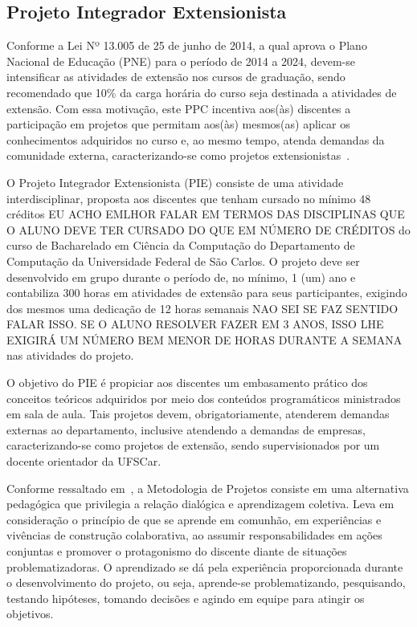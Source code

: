 
\subsection{Projeto Integrador Extensionista}\label{sec:pie-introducao}


Conforme a Lei Nº 13.005 de 25 de junho de 2014, a qual aprova o Plano Nacional de Educação (PNE) para o período de 2014 a 2024, devem-se intensificar as atividades de extensão nos cursos de graduação, sendo recomendado que 10\% da carga horária do curso seja destinada a atividades de extensão. Com essa motivação, este PPC incentiva aos(às) discentes a participação em projetos que permitam aos(às) mesmos(as) aplicar os conhecimentos adquiridos no curso e, ao mesmo tempo, atenda demandas da comunidade externa, caracterizando-se como projetos extensionistas~\cite{Brasil2014}.

O Projeto Integrador Extensionista (PIE) consiste de uma atividade interdisciplinar, proposta aos discentes que tenham cursado no mínimo 48 créditos {EU ACHO EMLHOR FALAR EM TERMOS DAS DISCIPLINAS QUE O ALUNO DEVE TER CURSADO DO QUE EM NÚMERO DE CRÉDITOS} do curso de Bacharelado em Ciência da Computação do Departamento de Computação da Universidade Federal de São Carlos. O projeto deve ser desenvolvido em grupo durante o período de, no mínimo, 1 (um) ano e contabiliza 300 horas em atividades de extensão para seus participantes, exigindo dos mesmos uma dedicação de 12 horas semanais {NAO SEI SE FAZ SENTIDO FALAR ISSO. SE O ALUNO RESOLVER FAZER EM 3 ANOS, ISSO LHE EXIGIRÁ UM NÚMERO BEM MENOR DE HORAS DURANTE A SEMANA} nas atividades do projeto.

O objetivo do PIE é propiciar aos discentes um embasamento prático dos conceitos teóricos adquiridos por meio dos conteúdos programáticos ministrados em sala de aula.  Tais projetos devem, obrigatoriamente, atenderem demandas externas ao departamento, inclusive atendendo a demandas de empresas, caracterizando-se como projetos de extensão, sendo supervisionados por um docente orientador da UFSCar.

Conforme ressaltado em~\cite{SENAC}, a Metodologia de Projetos consiste em uma alternativa pedagógica que privilegia a relação dialógica e aprendizagem coletiva. Leva em consideração o princípio de que se aprende em comunhão, em experiências e vivências de construção colaborativa, ao assumir responsabilidades em ações conjuntas e promover o protagonismo do discente diante de situações problematizadoras. O aprendizado se dá pela experiência proporcionada durante o desenvolvimento do projeto, ou seja, aprende-se problematizando, pesquisando, testando hipóteses, tomando decisões e agindo em equipe para atingir os objetivos.

